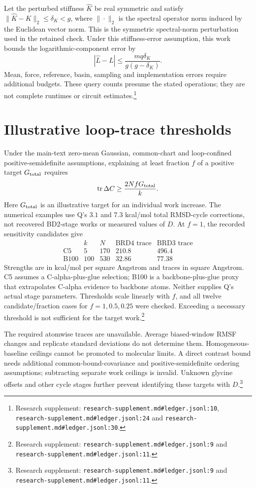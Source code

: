 \documentclass{article}
\begin{document}
Let the perturbed stiffness \(\widehat K\) be real symmetric and satisfy \(\|\widehat K-K\|_2\leq\delta_K<g\), where \(\|\cdot\|_2\) is the spectral operator norm induced by the Euclidean vector norm. This is the symmetric spectral-norm perturbation used in the retained check. Under this stiffness-error assumption, this work bounds the logarithmic-component error by
\[
 |\widehat L-L|\leq\frac{mq\delta_K}{g(g-\delta_K)}.
\]
Mean, force, reference, basin, sampling and implementation errors require additional budgets. These query counts presume the stated operations; they are not complete runtimes or circuit estimates.\footnote{Research supplement: \nolinkurl{research-supplement.md#ledger.jsonl:10}, \nolinkurl{research-supplement.md#ledger.jsonl:24} and \nolinkurl{research-supplement.md#ledger.jsonl:30}.}

\section{Illustrative loop-trace thresholds}\label{app:loop}

Under the main-text zero-mean Gaussian, common-chart and loop-confined positive-semidefinite assumptions, explaining at least fraction \(f\) of a positive target \(G_{\rm total}\) requires
\[
 \operatorname{tr}\Delta C\geq\frac{2NfG_{\rm total}}k.
\]
Here \(G_{\rm total}\) is an illustrative target for an individual work increase. The numerical examples use Q's \(3.1\) and \(7.3\) kcal/mol total RMSD-cycle corrections, not recovered BD2-stage works or measured values of \(D\). At \(f=1\), the recorded sensitivity candidates give
\[
\begin{array}{lcccc}
 &k&N&\text{BRD4 trace}&\text{BRD3 trace}\\
\text{C5}&5&170&210.8&496.4\\
\text{B100}&100&530&32.86&77.38
\end{array}
\]
Strengths are in kcal/mol per square Angstrom and traces in square Angstrom. C5 assumes a C-alpha-plus-glue selection; B100 is a backbone-plus-glue proxy that extrapolates C-alpha evidence to backbone atoms. Neither supplies Q's actual stage parameters. Thresholds scale linearly with \(f\), and all twelve candidate/fraction cases for \(f=1,0.5,0.25\) were checked. Exceeding a necessary threshold is not sufficient for the target work.\footnote{Research supplement: \nolinkurl{research-supplement.md#ledger.jsonl:9} and \nolinkurl{research-supplement.md#ledger.jsonl:11}.}

The required atomwise traces are unavailable. Average biased-window RMSF changes and replicate standard deviations do not determine them. Homogeneous-baseline ceilings cannot be promoted to molecular limits. A direct contrast bound needs additional common-bound-covariance and positive-semidefinite ordering assumptions; subtracting separate work ceilings is invalid. Unknown glycine offsets and other cycle stages further prevent identifying these targets with \(D\).\footnote{Research supplement: \nolinkurl{research-supplement.md#ledger.jsonl:9} and \nolinkurl{research-supplement.md#ledger.jsonl:11}.}
\end{document}
